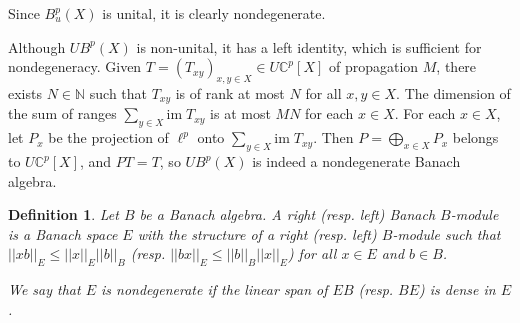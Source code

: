 \documentclass[a4,11pt]{amsart}
\newtheorem{lem}[thm]{Lemma}
\newtheorem{defn}[thm]{Definition}
\theoremstyle{remark}
\begin{document}
Since $B^p_u(X)$ is unital, it is clearly nondegenerate.
%
%
%

Although $UB^p(X)$ is non-unital, it has a left identity, which is sufficient for nondegeneracy.
Given $T=(T_{xy})_{x,y\in X}\in U\mathbb{C}^p[X]$ of propagation $M$, there exists $N\in\mathbb{N}$ such that $T_{xy}$ is of rank at most $N$ for all $x,y\in X$.
The dimension of the sum of ranges $\sum_{y\in X}\mathrm{im}\;T_{xy}$ is at most $MN$ for each $x\in X$.
For each $x\in X$, let $P_x$ be the projection of $\ell^p$ onto $\sum_{y\in X}\mathrm{im}\;T_{xy}$.
Then $P=\bigoplus_{x\in X}P_x$ belongs to $U\mathbb{C}^p[X]$, and $PT=T$, so $UB^p(X)$ is indeed a nondegenerate Banach algebra.

\begin{defn}
Let $B$ be a Banach algebra. A right (resp. left) Banach $B$-module is a Banach space $E$ with the structure of a right (resp. left) $B$-module such that $||xb||_E\leq||x||_E ||b||_B$ (resp. $||bx||_E\leq||b||_B||x||_E$) for all $x\in E$ and $b\in B$.

We say that $E$ is nondegenerate if the linear span of $EB$ (resp. $BE$) is dense in $E$. 
\end{defn}
\end{document}
